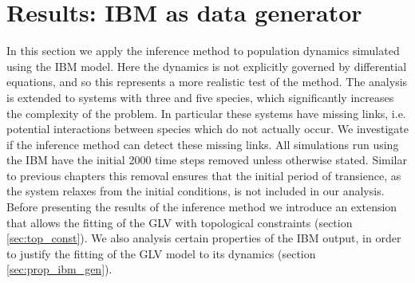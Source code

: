\section{Results: IBM as data generator}
\label{sec:ibm}


In this section we apply the inference method to population dynamics simulated using the IBM model. Here the dynamics is not explicitly governed by differential equations, and so this represents a more realistic test of the method. The analysis is extended to systems with three and five species, which significantly increases the complexity of the problem. In particular these systems have missing links, i.e. potential interactions between species which do not actually occur. We investigate if the inference method can detect these missing links. All simulations run using the IBM have the initial 2000 time steps removed unless otherwise stated. Similar to previous chapters this removal ensures that the initial period of transience, as the system relaxes from the initial conditions, is not included in our analysis. Before presenting the results of the inference method we introduce an extension that allows the fitting of the GLV with topological constraints (section \ref{sec:top_const}). We also analysis certain properties of the IBM output, in order to justify the fitting of the GLV model to its dynamics (section \ref{sec:prop_ibm_gen}). 


